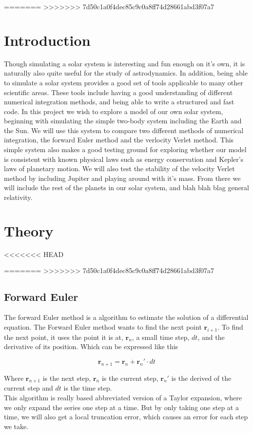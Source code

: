 \documentclass{article}
\begin{document}
\begin{multicols}{2}
=======
>>>>>>> 7d50c1a0f4dec85c9c0a8ff74d28661abd3f07a7
\section{Introduction}

Though simulating a solar system is interesting and fun enough on it's own, it is naturally also quite useful for the study of astrodynamics. In addition, being able to simulate a solar system provides a good set of tools applicable to many other scientific areas. These tools include having a good understanding of different numerical integration methods, and being able to write a structured and fast code. In this project we wish to explore a model of our own solar system, beginning with simulating the simple two-body system including the Earth and the Sun. We will use this system to compare two different methods of numerical integration, the forward Euler method and the verlocity Verlet method. This simple system also makes a good testing ground for exploring whether our model is consistent with known physical laws such as energy conservation and Kepler's laws of planetary motion. We will also test the stability of the velocity Verlet method by including Jupiter and playing around with it's mass. From there we will include the rest of the planets in our solar system, and blah blah blag general relativity. 

\section{Theory}
<<<<<<< HEAD

=======
>>>>>>> 7d50c1a0f4dec85c9c0a8ff74d28661abd3f07a7

\subsection{Forward Euler}
The forward Euler method is a algorithm to estimate the solution of a differential equation. The Forward Euler method wants to find the next point $\mathbf{r}_{i+1}$. To find the next point, it uses the point it is at, $\mathbf{r}_{n}$, a small time step, $dt$, and the derivative of its position. Which can be expressed like this

\begin{equation}
\mathbf{r}_{n+1}=\mathbf{r}_n + \mathbf{r}_n'\cdot dt
\label{eq:yn1}
\end{equation}

Where $\mathbf{r}_{n+1}$ is the next step, $\mathbf{r}_n$ is the current step, $\mathbf{r}_n'$ is the derived of the current step and $dt$ is the time step.\\
This algorithm is really based abbreviated version of a Taylor expansion, where we only expand the series one step at a time. But by only taking one step at a time, we will also get a local truncation error, which causes an error for each step we take. 


\end{multicols}
\end{document}
